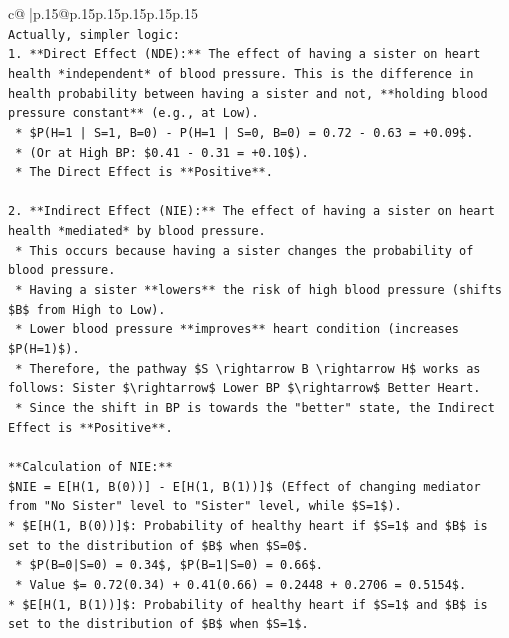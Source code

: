 \documentclass{article}
\begin{document}
{\begin{supertabular}{c@{$\;$}|p{.15\linewidth}@{}p{.15\linewidth}p{.15\linewidth}p{.15\linewidth}p{.15\linewidth}p{.15\linewidth}}
{{{\\ 
\texttt{Actually, simpler logic:} \\
\texttt{1.  **Direct Effect (NDE):** The effect of having a sister on heart health *independent* of blood pressure. This is the difference in health probability between having a sister and not, **holding blood pressure constant** (e.g., at Low).} \\
\texttt{    *   \$P(H=1 | S=1, B=0) {-} P(H=1 | S=0, B=0) = 0.72 {-} 0.63 = +0.09\$.} \\
\texttt{    *   (Or at High BP: \$0.41 {-} 0.31 = +0.10\$).} \\
\texttt{    *   The Direct Effect is **Positive**.} \\
\\ 
\texttt{2.  **Indirect Effect (NIE):** The effect of having a sister on heart health *mediated* by blood pressure.} \\
\texttt{    *   This occurs because having a sister changes the probability of blood pressure.} \\
\texttt{    *   Having a sister **lowers** the risk of high blood pressure (shifts \$B\$ from High to Low).} \\
\texttt{    *   Lower blood pressure **improves** heart condition (increases \$P(H=1)\$).} \\
\texttt{    *   Therefore, the pathway \$S \textbackslash{}rightarrow B \textbackslash{}rightarrow H\$ works as follows: Sister \$\textbackslash{}rightarrow\$ Lower BP \$\textbackslash{}rightarrow\$ Better Heart.} \\
\texttt{    *   Since the shift in BP is towards the "better" state, the Indirect Effect is **Positive**.} \\
\\ 
\texttt{**Calculation of NIE:**} \\
\texttt{\$NIE = E{[}H(1, B(0)){]} {-} E{[}H(1, B(1)){]}\$ (Effect of changing mediator from "No Sister" level to "Sister" level, while \$S=1\$).} \\
\texttt{*   \$E{[}H(1, B(0)){]}\$: Probability of healthy heart if \$S=1\$ and \$B\$ is set to the distribution of \$B\$ when \$S=0\$.} \\
\texttt{    *   \$P(B=0|S=0) = 0.34\$, \$P(B=1|S=0) = 0.66\$.} \\
\texttt{    *   Value \$= 0.72(0.34) + 0.41(0.66) = 0.2448 + 0.2706 = 0.5154\$.} \\
\texttt{*   \$E{[}H(1, B(1)){]}\$: Probability of healthy heart if \$S=1\$ and \$B\$ is set to the distribution of \$B\$ when \$S=1\$.} \\
}}}
\end{supertabular}}
\end{document}
